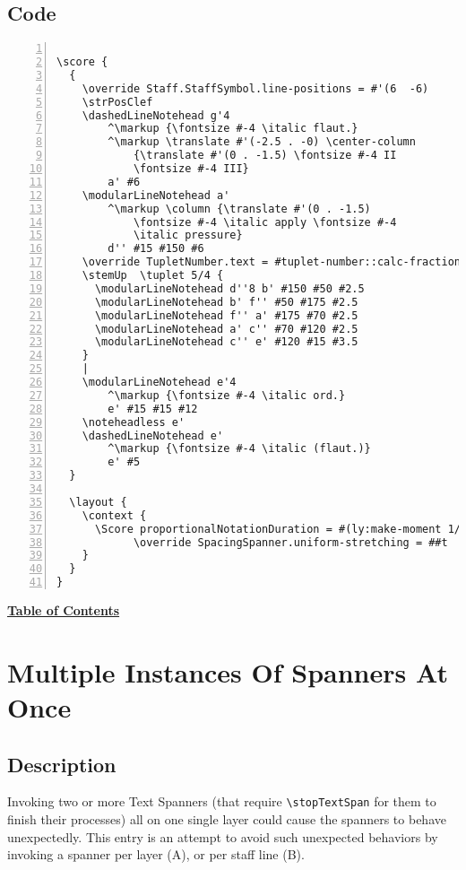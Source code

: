 \subsection{Code}
\begin{Verbatim}[numbers=left,xleftmargin=5mm]

\score {
  {
    \override Staff.StaffSymbol.line-positions = #'(6  -6)
    \strPosClef 
    \dashedLineNotehead g'4
    	^\markup {\fontsize #-4 \italic flaut.}
    	^\markup \translate #'(-2.5 . -0) \center-column 
			{\translate #'(0 . -1.5) \fontsize #-4 II 
			\fontsize #-4 III} 
		a' #6
    \modularLineNotehead a'
    	^\markup \column {\translate #'(0 . -1.5) 
			\fontsize #-4 \italic apply \fontsize #-4 
			\italic pressure} 
		d'' #15 #150 #6
    \override TupletNumber.text = #tuplet-number::calc-fraction-text
    \stemUp  \tuplet 5/4 {
      \modularLineNotehead d''8 b' #150 #50 #2.5
      \modularLineNotehead b' f'' #50 #175 #2.5
      \modularLineNotehead f'' a' #175 #70 #2.5
      \modularLineNotehead a' c'' #70 #120 #2.5
      \modularLineNotehead c'' e' #120 #15 #3.5
    }
    |
    \modularLineNotehead e'4
    	^\markup {\fontsize #-4 \italic ord.} 
		e' #15 #15 #12
    \noteheadless e'
    \dashedLineNotehead e'
    	^\markup {\fontsize #-4 \italic (flaut.)} 
		e' #5
  }

  \layout {
    \context {
      \Score proportionalNotationDuration = #(ly:make-moment 1/10)    
      		\override SpacingSpanner.uniform-stretching = ##t
    }
  }
}

\end{Verbatim}

\hyperref[sec:toc]{\textbf{Table of Contents}}

\vfill \break


\section {Multiple Instances Of Spanners At Once}
\label{sec:comb_spanners}
\hfill
{}
\hfill

\subsection{Description}
Invoking two or more Text Spanners (that require \verb|\stopTextSpan| for them to finish their processes) all on one single layer could cause the spanners to behave unexpectedly. This entry is an attempt to avoid such unexpected behaviors by invoking a spanner per layer (A), or per staff line (B).

